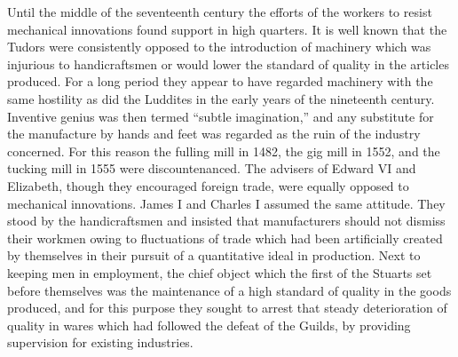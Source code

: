 \documentclass{book}
\begin{document}
Until the middle of the seventeenth century the efforts of the workers to resist mechanical innovations found support in high quarters. It is well known that the Tudors were consistently opposed to the introduction of machinery which was injurious to handicraftsmen or would lower the standard of quality in the articles produced. For a long period they appear to have regarded machinery with the same hostility as did the Luddites in the early years of the nineteenth century. Inventive genius was then termed “subtle imagination,” and any substitute for the manufacture by hands and feet was regarded as the ruin of the industry concerned. For this reason the fulling mill in 1482, the gig mill in 1552, and the tucking mill in 1555 were discountenanced. The advisers of Edward VI and Elizabeth, though they encouraged foreign trade, were equally opposed to mechanical innovations. James I and Charles I assumed the same attitude. They stood by the handicraftsmen and insisted that manufacturers should not dismiss their workmen owing to fluctuations of trade which had been artificially created by themselves in their pursuit of a quantitative ideal in production. Next to keeping men in employment, the chief object which the first of the Stuarts set before themselves was the maintenance of a high standard of quality in the goods produced, and for this purpose they sought to arrest that steady deterioration of quality in wares which had followed the defeat of the Guilds, by providing supervision for existing industries.
\end{document}
